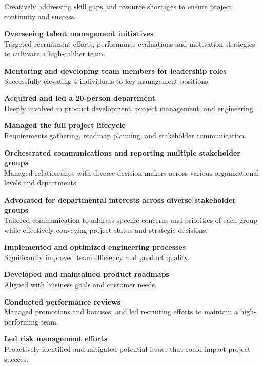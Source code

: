 \documentclass[]{external}
\begin{document}
\begin{paracol}{2}
\begin{tightemize}
        Creatively addressing skill gaps and resource shortages to ensure project continuity and success.
        \item \textbf{Overseeing talent management initiatives} \\
        Targeted recruitment efforts, performance evaluations and motivation strategies to cultivate a high-caliber team.
        \item \textbf{Mentoring and developing team members for leadership roles}\\ 
        Successfully elevating 4 individuals to key management positions.
    \end{tightemize}
    \sectionsep
    
    \vspace{\topsep}
    \begin{tightemize}
        \item \textbf{Acquired and led a 20-person department} \\ Deeply involved in product development, project management, and engineering.
        \item \textbf{Managed the full project lifecycle} \\ Requirements gathering, roadmap planning, and stakeholder communication.
        \item \textbf{Orchestrated communications and reporting multiple stakeholder groups} \\Managed relationships with diverse decision-makers across various organizational levels and departments.
        \item \textbf{Advocated for departmental interests across diverse stakeholder groups} \\ Tailored communication to address specific concerns and priorities of each group while effectively conveying project status and strategic decisions.
        \item \textbf{Implemented and optimized engineering processes} \\ Significantly improved team efficiency and product quality.
        \item \textbf{Developed and maintained product roadmaps} \\ Aligned with business goals and customer needs.
        \item \textbf{Conducted performance reviews} \\ Managed promotions and bonuses, and led recruiting efforts to maintain a high-performing team.
        \item \textbf{Led risk management efforts}\\ Proactively identified and mitigated potential issues that could impact project success.
    \end{tightemize}
    \sectionsep



\end{paracol}
\end{document}

